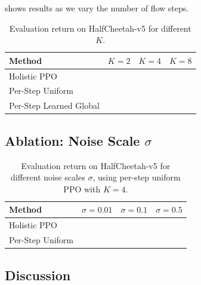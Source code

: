  shows results as we vary the number of flow steps.

\begin{table}[t]
  \centering
  \caption{Evaluation return on HalfCheetah-v5 for different $K$.}
  \label{tab:ablation_K}
  \begin{tabular}{@{}lccc@{}}
    \toprule
    \textbf{Method} & $K{=}2$ & $K{=}4$ & $K{=}8$ \\
    \midrule
    Holistic PPO              & \todo{---} & \todo{---} & \todo{---} \\
    Per-Step Uniform          & \todo{---} & \todo{---} & \todo{---} \\
    Per-Step Learned Global   & \todo{---} & \todo{---} & \todo{---} \\
    \bottomrule
  \end{tabular}
\end{table}


\subsection{Ablation: Noise Scale $\sigma$}
\label{sec:results:ablation_sigma}

\begin{table}[t]
  \centering
  \caption{Evaluation return on HalfCheetah-v5 for different noise scales
           $\sigma$, using per-step uniform PPO with $K{=}4$.}
  \label{tab:ablation_sigma}
  \begin{tabular}{@{}lccc@{}}
    \toprule
    \textbf{Method} & $\sigma{=}0.01$ & $\sigma{=}0.1$ & $\sigma{=}0.5$ \\
    \midrule
    Holistic PPO     & \todo{---} & \todo{---} & \todo{---} \\
    Per-Step Uniform & \todo{---} & \todo{---} & \todo{---} \\
    \bottomrule
  \end{tabular}
\end{table}


\subsection{Discussion}
\label{sec:results:discussion}

